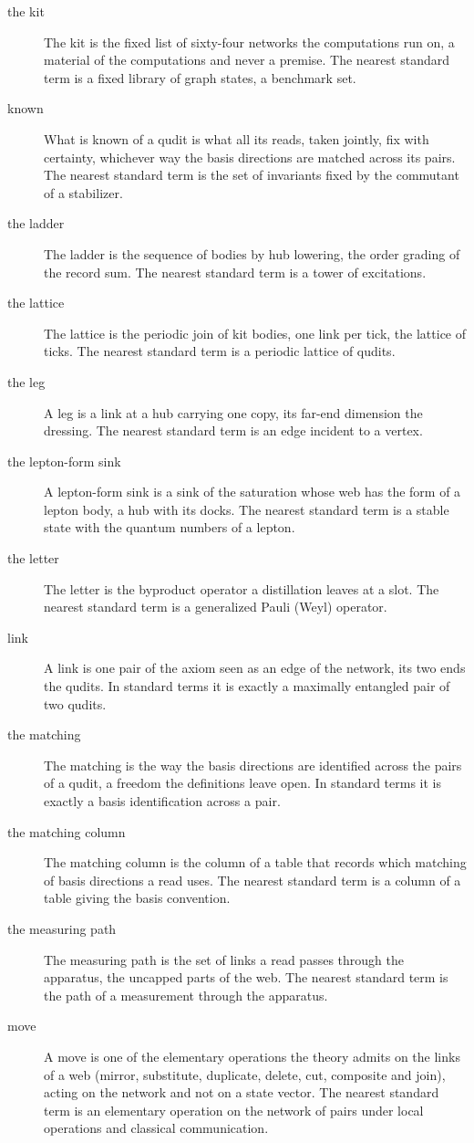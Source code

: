 \begin{description}
\item[the kit] The kit is the fixed list of sixty-four networks the computations run on, a material of the computations and never a premise. The nearest standard term is a fixed library of graph states, a benchmark set.
\item[known] What is known of a qudit is what all its reads, taken jointly, fix with certainty, whichever way the basis directions are matched across its pairs. The nearest standard term is the set of invariants fixed by the commutant of a stabilizer.
\item[the ladder] The ladder is the sequence of bodies by hub lowering, the order grading of the record sum. The nearest standard term is a tower of excitations.
\item[the lattice] The lattice is the periodic join of kit bodies, one link per tick, the lattice of ticks. The nearest standard term is a periodic lattice of qudits.
\item[the leg] A leg is a link at a hub carrying one copy, its far-end dimension the dressing. The nearest standard term is an edge incident to a vertex.
\item[the lepton-form sink] A lepton-form sink is a sink of the saturation whose web has the form of a lepton body, a hub with its docks. The nearest standard term is a stable state with the quantum numbers of a lepton.
\item[the letter] The letter is the byproduct operator a distillation leaves at a slot. The nearest standard term is a generalized Pauli (Weyl) operator.
\item[link] A link is one pair of the axiom seen as an edge of the network, its two ends the qudits. In standard terms it is exactly a maximally entangled pair of two qudits.
\item[the matching] The matching is the way the basis directions are identified across the pairs of a qudit, a freedom the definitions leave open. In standard terms it is exactly a basis identification across a pair.
\item[the matching column] The matching column is the column of a table that records which matching of basis directions a read uses. The nearest standard term is a column of a table giving the basis convention.
\item[the measuring path] The measuring path is the set of links a read passes through the apparatus, the uncapped parts of the web. The nearest standard term is the path of a measurement through the apparatus.
\item[move] A move is one of the elementary operations the theory admits on the links of a web (mirror, substitute, duplicate, delete, cut, composite and join), acting on the network and not on a state vector. The nearest standard term is an elementary operation on the network of pairs under local operations and classical communication.

\end{description}
